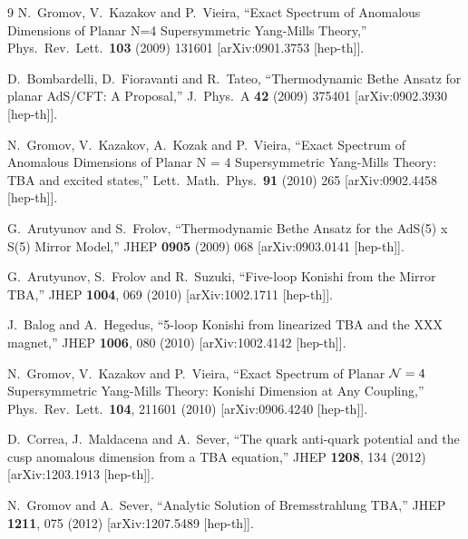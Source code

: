 \documentclass[a4paper,11pt]{article}
\numberwithin{equation}{section}
\begin{document}
\begin{thebibliography} {9}
  N.~Gromov, V.~Kazakov and P.~Vieira,
  ``Exact Spectrum of Anomalous Dimensions of Planar N=4 Supersymmetric Yang-Mills Theory,''
  Phys.\ Rev.\ Lett.\  {\bf 103} (2009) 131601
  [arXiv:0901.3753 [hep-th]].

  D.~Bombardelli, D.~Fioravanti and R.~Tateo,
  ``Thermodynamic Bethe Ansatz for planar AdS/CFT: A Proposal,''
  J.\ Phys.\ A {\bf 42} (2009) 375401
  [arXiv:0902.3930 [hep-th]].

  N.~Gromov, V.~Kazakov, A.~Kozak and P.~Vieira,
  ``Exact Spectrum of Anomalous Dimensions of Planar N = 4 Supersymmetric Yang-Mills Theory: TBA and excited states,''
  Lett.\ Math.\ Phys.\  {\bf 91} (2010) 265
  [arXiv:0902.4458 [hep-th]].

  G.~Arutyunov and S.~Frolov,
  ``Thermodynamic Bethe Ansatz for the AdS(5) x S(5) Mirror Model,''
  JHEP {\bf 0905} (2009) 068
  [arXiv:0903.0141 [hep-th]].

  G.~Arutyunov, S.~Frolov and R.~Suzuki,
  ``Five-loop Konishi from the Mirror TBA,''
  JHEP {\bf 1004}, 069 (2010)
  [arXiv:1002.1711 [hep-th]].

  J.~Balog and A.~Hegedus,
  ``5-loop Konishi from linearized TBA and the XXX magnet,''
  JHEP {\bf 1006}, 080 (2010)
  [arXiv:1002.4142 [hep-th]].

  N.~Gromov, V.~Kazakov and P.~Vieira,
  ``Exact Spectrum of Planar ${\cal N}=4$ Supersymmetric Yang-Mills Theory: Konishi Dimension at Any Coupling,''
  Phys.\ Rev.\ Lett.\  {\bf 104}, 211601 (2010)
  [arXiv:0906.4240 [hep-th]].

  D.~Correa, J.~Maldacena and A.~Sever,
  ``The quark anti-quark potential and the cusp anomalous dimension from a TBA equation,''
  JHEP {\bf 1208}, 134 (2012)
  [arXiv:1203.1913 [hep-th]].

  N.~Gromov and A.~Sever,
  ``Analytic Solution of Bremsstrahlung TBA,''
  JHEP {\bf 1211}, 075 (2012)
  [arXiv:1207.5489 [hep-th]].


\end{thebibliography}
\end{document}
